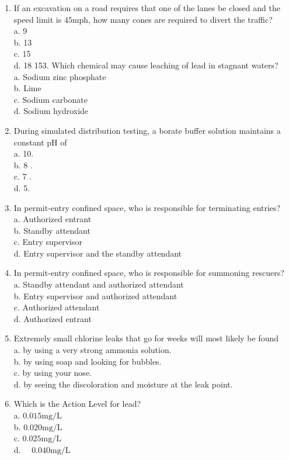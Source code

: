 \documentclass[10pt]{article}
\begin{document}
\begin{enumerate}
  \item If an excavation on a road requires that one of the lanes be closed and the speed limit is $45 \mathrm{mph}$, how many cones are required to divert the traffic?\\
a. 9\\
b. 13\\
c. 15\\
d. 18 153. Which chemical may cause leaching of lead in stagnant waters?\\
a. Sodium zinc phosphate\\
b. Lime\\
c. Sodium carbonate\\
d. Sodium hydroxide

  \item During simulated distribution testing, a borate buffer solution maintains a constant $\mathrm{pH}$ of\\
a. 10.\\
b. 8 .\\
c. 7 .\\
d. 5.

  \item In permit-entry confined space, who is responsible for terminating entries?\\
a. Authorized entrant\\
b. Standby attendant\\
c. Entry supervisor\\
d. Entry supervisor and the standby attendant

  \item In permit-entry confined space, who is responsible for summoning rescuers?\\
a. Standby attendant and authorized attendant\\
b. Entry supervisor and authorized attendant\\
c. Authorized attendant\\
d. Authorized entrant

  \item Extremely small chlorine leaks that go for weeks will most likely be found\\
a. by using a very strong ammonia solution.\\
b. by using soap and looking for bubbles.\\
c. by using your nose.\\
d. by seeing the discoloration and moisture at the leak point.

  \item Which is the Action Level for lead?\\
a. $0.015 \mathrm{mg} / \mathrm{L}$\\
b. $0.020 \mathrm{mg} / \mathrm{L}$\\
c. $0.025 \mathrm{mg} / \mathrm{L}$\\
d. $\quad 0.040 \mathrm{mg} / \mathrm{L}$


\end{enumerate}
\end{document}
